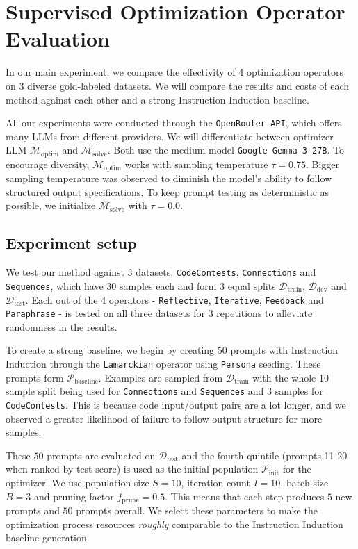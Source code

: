 \section{Supervised Optimization Operator Evaluation}
In our main experiment, we compare the effectivity of 4 optimization operators on 3 diverse gold-labeled datasets.
We will compare the results and costs of each method against each other and a strong Instruction Induction baseline.

All our experiments were conducted through the \texttt{OpenRouter API}, which offers many LLMs from different providers.
We will differentiate between optimizer LLM $\mathscr{M}_{\text{optim}}$ and $\mathscr{M}_{\text{solve}}$.
Both use the medium model \texttt{Google Gemma 3 27B}\cite{gemmateam2025gemma3technicalreport}. 
To encourage diversity, $\mathscr{M}_{\text{optim}}$ works with sampling temperature $\tau = 0.75$. 
Bigger sampling temperature was observed to diminish the model's ability to follow structured output specifications.
To keep prompt testing as deterministic as possible, we initialize $\mathscr{M}_{\text{solve}}$ with $\tau = 0.0$.


\subsection{Experiment setup}
We test our method against 3 datasets, \texttt{CodeContests}, \texttt{Connections}  and \texttt{Sequences}, which have 30 samples each 
and form 3 equal splits $\mathcal{D}_{\text{train}}$, $\mathcal{D}_{\text{dev}}$ and $\mathcal{D}_{\text{test}}$. Each out of the 4 operators - \texttt{Reflective}, \texttt{Iterative}, \texttt{Feedback} and \texttt{Paraphrase} - is tested on all three datasets for 3 repetitions
to alleviate randomness in the results.

To create a strong baseline, we begin by creating $50$ prompts with Instruction Induction through the \texttt{Lamarckian} operator 
using \texttt{Persona}\cite{ge2024scalingsyntheticdatacreation} seeding. These prompts form $\mathscr{P}_{\text{baseline}}$. Examples are sampled from $\mathcal{D}_{\text{train}}$ with the whole 10 sample split being used for \texttt{Connections} and \texttt{Sequences}
and 3 samples for \texttt{CodeContests}. This is because code input/output pairs are a lot longer, and we observed a greater likelihood of failure to follow output structure for more samples.

These $50$ prompts are evaluated on $\mathcal{D}_{\text{test}}$ and the fourth quintile (prompts 11-20 when ranked by test score) is used as the initial population $\mathscr{P}_{\text{init}}$ for the optimizer.
We use population size $S=10$, iteration count $I=10$, batch size $B=3$ and pruning factor $f_{\text{prune}} = 0.5$. This means that each step produces $5$ new prompts and $50$ prompts overall.
We select these parameters to make the optimization process resources \textit{roughly} comparable to the Instruction Induction baseline generation.


